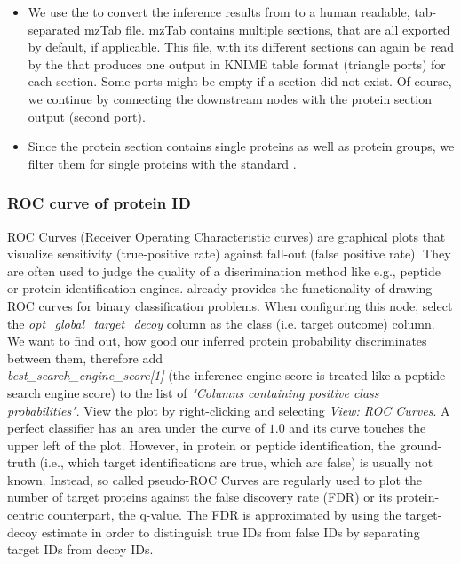 \begin{itemize}
\item We use the  to convert the inference results from  to a human 
readable, tab-separated mzTab file. mzTab contains multiple sections, that are all exported by default, if 
applicable. This file, with its different sections can again be read by the  that produces one 
output in KNIME table format (triangle ports) for each section. Some ports might be empty if a section did not exist. 
Of course, we continue by connecting the downstream nodes with the protein section output (second port).
\item Since the protein section contains single proteins as well as protein groups, we filter them for single 
proteins with the standard . 
\end{itemize}

\subsubsection{ROC curve of protein ID}

ROC Curves (Receiver Operating Characteristic curves) are graphical plots that visualize sensitivity (true-positive 
rate) against fall-out (false positive rate). They are often used to judge the quality of a discrimination method 
like e.g., peptide or protein identification engines. 
 already provides the functionality of drawing ROC curves for binary classification problems. 
When configuring this node, select the \textit{opt\_global\_target\_decoy} column as the class (i.e. target outcome) 
column. We want to find out, how good our inferred protein probability discriminates between them, therefore add\\
\textit{best\_search\_engine\_score[1]} (the inference engine score is treated like a peptide search engine score) to 
the list of \textit{"Columns containing positive class probabilities"}. View the plot by right-clicking and selecting 
\textit{View: ROC Curves}. A perfect classifier has an area under the curve of $1.0$ and its curve touches the upper 
left of the plot.
However, in protein or peptide identification, the ground-truth (i.e., which target identifications are true, which 
are false) is usually not known. Instead, so called pseudo-ROC Curves are regularly used to plot the number of target 
proteins against the false discovery rate (FDR) or its protein-centric counterpart, the q-value. 
The FDR is approximated by using the target-decoy estimate in order to distinguish
true IDs from false IDs by separating target IDs from decoy IDs.

